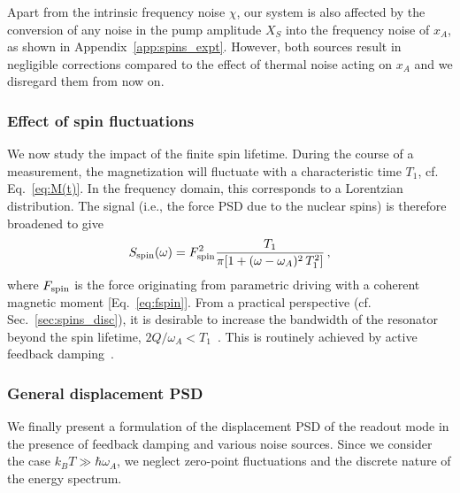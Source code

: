 Apart from the intrinsic frequency noise $\chi$, our system is also affected by the conversion of any noise in the pump amplitude $X_S$ into the frequency noise of $x_A$, as shown in Appendix~\ref{app:spins_expt}. However, both sources result in negligible corrections compared to the effect of thermal noise acting on $x_A$ and we disregard them from now on.

\subsubsection{Effect of spin fluctuations} We now study the impact of the finite spin lifetime. During the course of a measurement, the magnetization will fluctuate with a characteristic time $T_1$, cf. Eq.~\eqref{eq:M(t)}. In the frequency domain, this corresponds to a Lorentzian distribution. The signal (i.e., the force PSD due to the nuclear spins) is therefore broadened to give
\begin{equation}\label{eq:S_spin}
S_{\rm spin}(\omega) = F^2_{\rm spin} \frac{T_1}{\pi[1 + (\omega-\omega_A)^2 \,T_1^2]}\,,
\end{equation}
where $F_{\rm spin}$ is the force originating from parametric driving with a coherent magnetic moment [Eq.~\eqref{eq:fspin}]. From a practical perspective (cf. Sec.~\ref{sec:spins_disc}), it is desirable to increase the bandwidth of the resonator beyond the spin lifetime, $2 Q / \omega_A < T_1$~\cite{Degen_2007}. This is routinely achieved by active feedback damping~\cite{Courty_2001, Kleckner_2006, Poggio_2007, Rossi_2018}.


\subsubsection{General displacement PSD} We finally present a formulation of the displacement PSD of the readout mode in the presence of feedback damping and various noise sources. Since we consider the case $k_B T  \gg \hbar\omega_A$, we neglect zero-point fluctuations and the discrete nature of the energy spectrum. 

